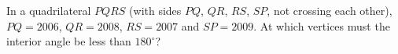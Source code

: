 In a quadrilateral $PQRS$ (with sides $PQ$, $QR$, $RS$, $SP$, not crossing each other), $PQ=2006$, $QR=2008$, $RS=2007$ and $SP=2009$. At which vertices must the interior angle be less than $180^\circ$?

